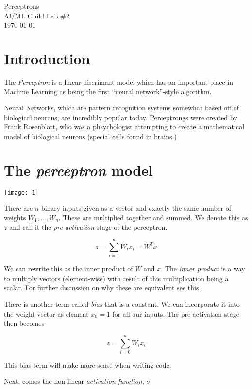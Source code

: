 \documentclass[letterpaper,12pt]{article}
\begin{document}
\begin{flushleft}
Perceptrons\\
AI/ML Guild Lab \#2\\
\today \\
\end{flushleft}

\section{Introduction}

The \emph{Perceptron} is a linear discrimant model which has an important place
in Machine Learning as being the first ``neural network''-style algorithm.

Neural Networks, which are pattern recognition systems somewhat based off of
biological neurons, are incredibly popular today. Perceptrongs were created by
Frank Rosenblatt, who was a phsychologist attempting to create a mathematical
model of biological neurons (special cells found in brains.)

\section{The \emph{perceptron} model}

\texttt{[image: 1]}

There are $n$ binary inputs given as a vector and exactly the same number of
weights $W_1, \ldots, W_n$.  These are multiplied together and summed. We denote
this as $z$ and call it the \emph{pre-activation} stage of the perceptron.

\[
    z = \sum_{i=1}^{n} W_i x_i = W^{T}x
\]

We can rewrite this as the inner product of $W$ and $x$. The \emph{inner
product} is a way to multiply vectors (element-wise) with result of this
multiplication being a scalar. For further discussion on why these are
equivalent see
\href{http://www.sharetechnote.com/html/Handbook_EngMath_Matrix_InnerProduct.html}{this}.

There is another term called \emph{bias} that is a constant. We can incorporate it
into the weight vector as element $x_0 = 1$ for all our inputs. The
pre-activation stage then becomes

\[
    z = \sum_{i=0}^{n} W_i x_i
\]

This bias term will make more sense when writing code.

Next, comes the non-linear \emph{activation function}, $\sigma$.
\end{document}
